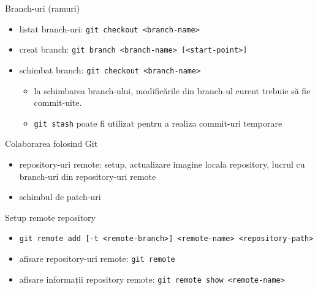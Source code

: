 \documentclass{beamer}
\begin{document}
\begin{frame}{Branch-uri (ramuri)}
\begin{itemize} %
\item listat branch-uri: \texttt{git checkout <branch-name>}
\item creat branch: \texttt{git branch <branch-name> [<start-point>] }
\item schimbat branch: \texttt{git checkout <branch-name>}
\begin{itemize}
	\item la schimbarea branch-ului, modificările din branch-ul curent trebuie să fie commit-uite.
	\item \texttt{git stash} poate fi utilizat pentru a realiza commit-uri temporare
\end{itemize}
\end{itemize}
\end{frame}


\begin{frame}{Colaborarea folosind Git}
\begin{itemize} %
\item repository-uri remote: setup, actualizare imagine locala repository, lucrul cu branch-uri din repository-uri remote
\item schimbul de patch-uri
\end{itemize}
\end{frame}

\begin{frame}{Setup remote repository}
\begin{itemize} %
\item \texttt{git remote add [-t <remote-branch>] <remote-name> <repository-path>}
\\
\pause\item afisare repository-uri remote: \texttt{git remote}
\item afisare informații repository remote: \texttt{git remote show <remote-name>}
\end{itemize}
\end{frame}
\end{document}
